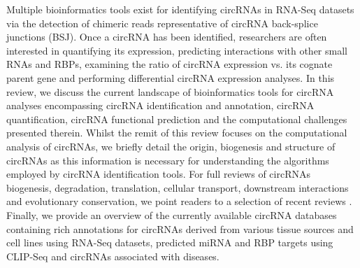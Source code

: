 \documentclass[journal,review,submit,pdftex,moreauthors]{Definitions/mdpi}
\begin{document}
Multiple bioinformatics tools exist for identifying circRNAs in RNA-Seq datasets via the detection of chimeric reads representative of circRNA back-splice junctions (BSJ). Once a circRNA has been identified, researchers are often interested in quantifying its expression, predicting interactions with other small RNAs and RBPs, examining the ratio of circRNA expression vs. its cognate parent gene and performing differential circRNA expression analyses. In this review, we discuss the current landscape of bioinformatics tools for circRNA analyses encompassing circRNA identification and annotation, circRNA quantification, circRNA functional prediction and the computational challenges presented therein. Whilst the remit of this review focuses on the computational analysis of circRNAs, we briefly detail the origin, biogenesis and structure of circRNAs as this information is necessary for understanding the algorithms employed by circRNA identification tools. For full reviews of circRNAs biogenesis, degradation, translation, cellular transport, downstream interactions and evolutionary conservation, we point readers to a selection of recent reviews \cite{Greene2017Jun, Kristensen2019Nov, Li2018Aug, Ren2022Dec, Yang2021May, Huang2020, Panda2018, Santos-Rodriguez2021Sep}. Finally, we provide an overview of the currently available circRNA databases containing rich annotations for circRNAs derived from various tissue sources and cell lines using RNA-Seq datasets, predicted miRNA and RBP targets using CLIP-Seq and circRNAs associated with diseases. 
\end{document}
